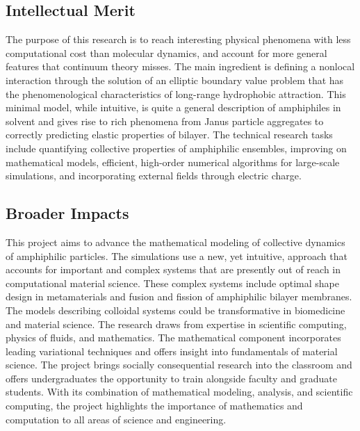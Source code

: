 \documentclass[10pt]{article}
\begin{document}
\subsection*{Intellectual Merit}
\vspace{-0.1in}
The purpose of this research is to reach interesting physical phenomena with less computational cost than molecular dynamics, and account for more general features that continuum theory misses. The main ingredient is defining a nonlocal interaction through the solution of an elliptic boundary value problem that has the phenomenological characteristics of long-range hydrophobic attraction. This minimal model, while intuitive, is quite a general description of amphiphiles in solvent and gives rise to rich phenomena from Janus particle aggregates to correctly predicting elastic properties of bilayer. The technical research tasks include quantifying collective properties of amphiphilic ensembles, improving on mathematical models, efficient, high-order numerical algorithms for large-scale simulations, and incorporating external fields through electric charge.

\subsection*{Broader Impacts}
\vspace{-0.1in}
This project aims to advance the mathematical modeling of collective dynamics of amphiphilic particles. The simulations use a new, yet intuitive, approach that accounts for important and complex systems that are presently out of reach in computational material science. These complex systems include optimal shape design in metamaterials and fusion and fission of amphiphilic bilayer membranes. The models describing colloidal systems could be transformative in biomedicine and material science. The research draws from expertise in scientific computing, physics of fluids, and mathematics. The mathematical component incorporates leading variational techniques and offers insight into fundamentals of material science. The project brings socially consequential research into the classroom and offers undergraduates the opportunity to train alongside faculty and graduate students. With its combination of mathematical modeling, analysis, and scientific computing, the project highlights the importance of mathematics and computation to all areas of science and engineering.
\end{document}
